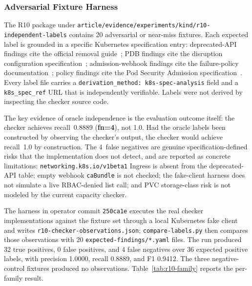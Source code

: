 \documentclass[10pt,journal]{IEEEtran}
\newcommand{\code}[1]{\texttt{#1}}
\begin{document}
\subsubsection*{Adversarial Fixture Harness}
The R10 package under \code{article/evidence/experiments/kind/r10-independent-labels} contains 20 adversarial or near-miss fixtures. Each expected label is grounded in a specific Kubernetes specification entry: deprecated-API findings cite the official removal guide~\cite{kubernetesDeprecationGuide,kubernetesDeprecationPolicy}; PDB findings cite the disruption configuration specification~\cite{kubernetesDisruptions,kubernetesPdbTask}; admission-webhook findings cite the failure-policy documentation~\cite{kubernetesAdmissionWebhooks,kubernetesAdmissionWebhooksGoodPractices}; policy findings cite the Pod Security Admission specification~\cite{kubernetesPodSecurityAdmission,kubernetesPodSecurityStandards}. Every label file carries a \texttt{derivation\_method: k8s-spec-analysis} field and a \texttt{k8s\_spec\_ref} URL that is independently verifiable. Labels were not derived by inspecting the checker source code.

The key evidence of oracle independence is the evaluation outcome itself: the checker achieves recall~0.8889 (\textbf{fn=4}), not 1.0. Had the oracle labels been constructed by observing the checker's output, the checker would achieve recall~1.0 by construction. The 4~false negatives are genuine specification-defined risks that the implementation does not detect, and are reported as concrete limitations: \code{networking.k8s.io/v1beta1} Ingress is absent from the deprecated-API table; empty webhook \code{caBundle} is not checked; the fake-client harness does not simulate a live RBAC-denied list call; and PVC storage-class risk is not modeled by the current capacity checker.

The harness in operator commit \code{250ca1e} executes the real checker implementations against the fixture set through a local Kubernetes fake client and writes \code{r10-checker-observations.json}; \code{compare-labels.py} then compares those observations with 20 \code{expected-findings/*.yaml} files. The run produced 32 true positives, 0 false positives, and 4 false negatives over 36 expected positive labels, with precision 1.0000, recall 0.8889, and F1 0.9412. The three negative-control fixtures produced no observations. Table~\ref{tab:r10-family} reports the per-family result.
\end{document}

